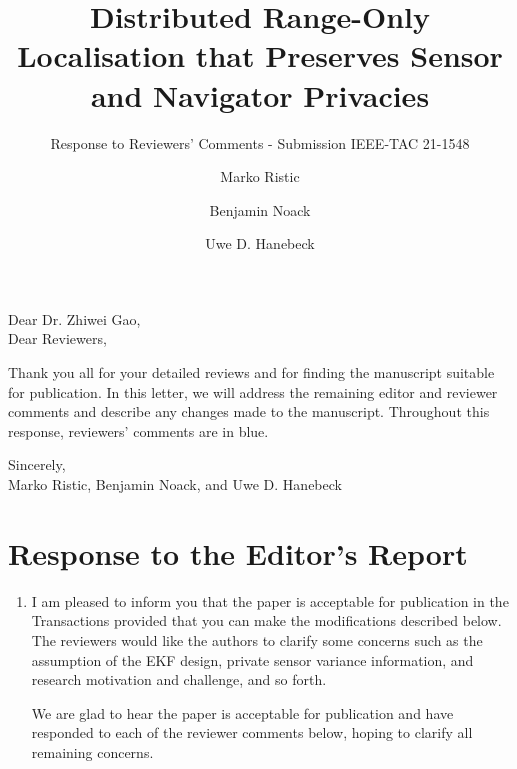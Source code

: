 \documentclass[a4paper]{scrartcl}
\title{\boldmath Distributed Range-Only Localisation that Preserves Sensor and Navigator Privacies}
\subtitle{Response to Reviewers' Comments - Submission IEEE-TAC 21-1548}
\author{Marko Ristic\and Benjamin Noack\and Uwe D. Hanebeck}
\newenvironment{rebuttal}{\begin{enumerate}[label={\color{grey}\thesection.\arabic{enumi}},leftmargin=0pt,ref=\thesection.\arabic{enumi}]}{\end{enumerate}}
\newcommand{\reviewtext}[1]{{\color{nblue} #1}}
\begin{document}
\maketitle

Dear Dr. Zhiwei Gao,\\
Dear Reviewers,

Thank you all for your detailed reviews and for finding the manuscript suitable for publication. In this letter, we will address the remaining editor and reviewer comments and describe any changes made to the manuscript. Throughout this response, reviewers' comments are in \reviewtext{blue}. 

Sincerely,\\
Marko Ristic, Benjamin Noack, and Uwe D. Hanebeck




\section*{Response to the Editor's Report}
\def\thesection{E}
\begin{rebuttal} %
\item \reviewtext{I am pleased to inform you that the paper is acceptable for publication in the Transactions provided that you can make the modifications described below. The reviewers would like the authors to clarify some concerns such as the assumption of the EKF design, private sensor variance information, and research motivation and challenge, and so forth.}

We are glad to hear the paper is acceptable for publication and have responded to each of the reviewer comments below, hoping to clarify all remaining concerns.

\end{rebuttal}

\end{document}
